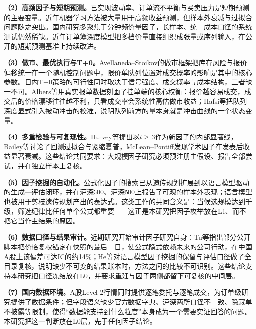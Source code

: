 \documentclass[11pt,a4paper]{article}
\begin{document}
\textbf{（2）高频因子与短期预测。}已实现波动率、订单流不平衡与买卖压力是短期预测的主要变量\citep{andersen1998,barndorffnielsen2004, cont2014}。近年机器学习方法被大量用于高频收益预测\citep{gu2020, krauss2017,fischer2018}，但样本外衰减与过拟合问题随之突出。国内研究多聚焦于分钟频价量因子，长样本、统一成本口径的系统测试仍然稀缺\citep{shichuan2020,zhao2025hf}。近年订单簿深度模型把多档价量直接组织成张量或序列输入，在公开的短期预测基准上持续改进\citep{gu2026tensorlob}。

\textbf{（3）做市、最优执行与T+0。}Avellaneda--Stoikov的做市框架把库存风险与报价偏移统一在一个随机控制问题中\citep{avellaneda2008, stoikov2018}，限价单队列位置对成交概率的影响是其中的核心参数。日内T+0策略的可行性同时取决于信号强度、成交概率与成本结构，三者缺一不可。Albers等用真实报单数据刻画了挂单端的核心权衡：报价越容易成交，成交后的价格漂移往往越不利，只看成交率会系统性高估做市收益\citep{albers2025marketmaker}；Hafsi等把队列深度显式引入被动冲击的校准，说明队列前方的量本身就是冲击曲线的一个状态变量\citep{hafsi2026queue}。

\textbf{（4）多重检验与可复现性。}Harvey等提出以$t\ge3$作为新因子的内部显著线\citep{harvey2016}，Bailey等讨论了回测过拟合与紧缩夏普\citep{bailey2017,lopezdeprado2018}，McLean--Pontiff发现学术因子在发表后收益显著衰减\citep{mclean2016}。这些结论共同要求：大规模因子研究必须预注册主假设、报告全部尝试，并在独立样本上复核。

\textbf{（5）因子挖掘的自动化。}公式化因子的搜索已从遗传规划扩展到以语言模型驱动的生成—评估闭环\citep{wang2025alpha,tang2025alphaagent, zhang2025survey,shi2025alphaforge}，并在沪深300、沪深500上报告了可观的样本外表现\citep{wang2026cosmosalpha}；语言模型也被用于剪枝遗传规划产出的表达式\citep{chen2026llm}。这类工作的共同含义是：当候选规模达到千级，筛选纪律比任何单个公式都重要——这正是本研究把因子枚举放在L1、而不把它当作主结果的原因。

\textbf{（6）数据口径与结果审计。}近期研究开始审计因子研究自身：Tu等指出部分公开脚本把价格复权锚定在快照的最后一日，使公式隐式依赖未来的公司行动，在中国A股上该偏差可达IC的约14\%\citep{tu2026anchor}；He等对语言模型因子挖掘的保留与评估口径做了全目录复核，说明缺少不可变的结果账本时，方法之间的比较不可识别\citep{he2026audit}。这些结论支持本研究把口径冻结放在L0，并要求重建与因子两侧都留下可复核的中间层。

\textbf{（7）国内数据环境。}A股Level-2行情同时提供逐笔委托与逐笔成交，为订单级研究提供了数据条件；但字段语义缺少官方数据字典、沪深两所口径不一致、隐藏单不披露等限制，使得``数据能支持到什么粒度''本身成为一个需要实证回答的问题。本研究把这一判断放在L0层，先于任何因子结论。
\end{document}
